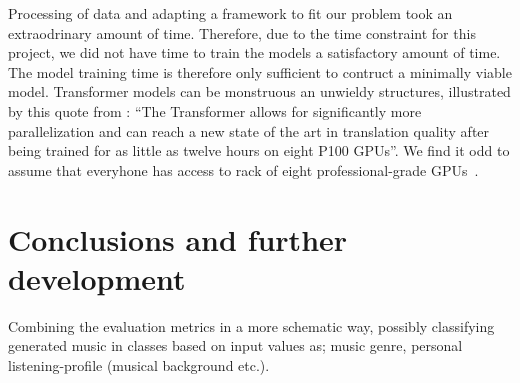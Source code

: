 \documentclass{IEEEtran}
\begin{document}
Processing of data and adapting a framework to fit our problem 
took an extraodrinary amount of time. Therefore, due to the time constraint
for this project, we did not have time to train the models a satisfactory
amount of time. The model training time is therefore only sufficient to 
contruct a minimally viable model. Transformer models can be monstruous 
an unwieldy structures, illustrated by this quote from
\citeauthor{vaswani2017attention}: ``The Transformer allows for significantly
more parallelization and can reach a new state of the art in translation
quality after being trained for as little as twelve hours on eight P100 GPUs''.
We find it odd to assume that everyhone has access to rack of eight 
professional-grade GPUs~\cite{vaswani2017attention}.

\section{Conclusions and further development}

Combining the evaluation
metrics in a more schematic way, possibly classifying generated music in
classes based on input values as; music genre, personal listening-profile
(musical background etc.).

\vfill

\pagebreak

\printbibliography
\end{document}
